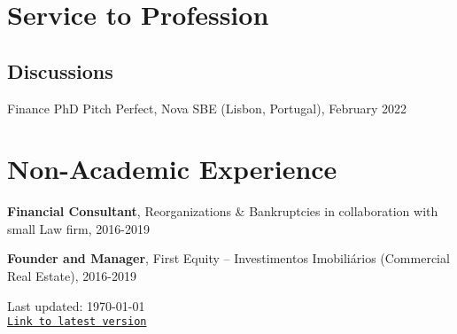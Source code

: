 \documentclass[letterpaper]{article}
\def\footerlink{https://miguelcfoliveira.github.io/CV/CV.pdf}
\renewenvironment{itemize}{
  \begin{list}{}{
    \setlength{\leftmargin}{1.5em}
  }
}{
  \end{list}
}
\begin{document}
\section*{Service to Profession}
\subsection*{Discussions}

\begin{itemize}
\item Finance PhD Pitch Perfect, Nova SBE (Lisbon, Portugal), February 2022
\end{itemize}

\section*{Non-Academic Experience}

\begin{itemize}
\item \textbf{Financial Consultant}, Reorganizations \& Bankruptcies in collaboration with small Law firm, 2016-2019
\item \textbf{Founder and Manager}, First Equity – Investimentos Imobiliários (Commercial Real Estate), 2016-2019
\end{itemize}




\bigskip

\begin{center}
  \begin{footnotesize}
    Last updated: \today \\
    \href{\footerlink}{\texttt{Link to latest version}}
  \end{footnotesize}
\end{center}
\end{document}
